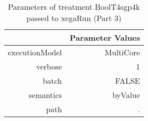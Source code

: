 \begin{table}[ht]
\centering
\begin{tabular}{rr}
  \hline
 & Parameter Values \\ 
  \hline
executionModel & MultiCore \\ 
  verbose & 1 \\ 
  batch & FALSE \\ 
  semantics & byValue \\ 
  path & . \\ 
   \hline
\end{tabular}
\caption{ Parameters of treatment BoolT4sgp4k passed to xegaRun
 (Part 3)} 
\end{table}
